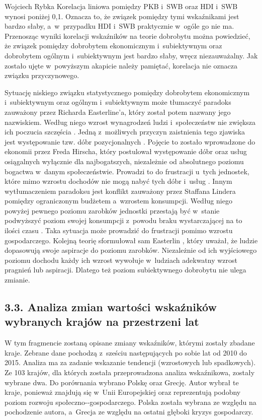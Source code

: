 \begin{artplenv}{Wojciech Rybka}
Korelacja liniowa pomiędzy PKB i~SWB oraz HDI i~SWB wynosi poniżej 0,1. Oznacza to, że związek pomiędzy tymi wskaźnikami
jest bardzo słaby, a~w~przypadku HDI i~SWB praktycznie w~ogóle go nie ma. Przenosząc wyniki korelacji wskaźników na
teorie dobrobytu można powiedzieć, że związek pomiędzy dobrobytem ekonomicznym i~subiektywnym oraz dobrobytem
ogólnym i~subiektywnym jest bardzo słaby, wręcz niezauważalny. Jak zostało ujęte w~powyższym akapicie należy pamiętać,
korelacja nie oznacza związku przyczynowego. 

Sytuację niskiego związku statystycznego pomiędzy dobrobytem ekonomicznym  i~subiektywnym oraz ogólnym i~subiektywnym
może tłumaczyć paradoks zauważony przez Richarda Easterline'a, który został potem nazwany jego nazwiskiem. Według niego
wzrost wynagrodzeń ludzi i~społeczeństw nie zwiększa ich poczucia szczęścia
\parencite{czapinski_ekonomia_2012}.
Jedną z~możliwych przyczyn zaistnienia tego zjawiska jest występowanie tzw. dóbr pozycjonalnych
\parencite{ostrowski_czy_2012}.
Pojęcie to zostało wprowadzone do ekonomii przez Freda Hirscha, który
postulował występowanie dóbr oraz usług osiągalnych wyłącznie dla najbogatszych, niezależnie od absolutnego poziomu
bogactwa w~danym społeczeństwie. Prowadzi to do frustracji u~tych jednostek, które mimo wzrostu dochodów nie mogą nabyć
tych dóbr i~usług
\parencite{hirsch_social_2005}.
Innym wytłumaczeniem paradoksu jest konflikt zauważony przez
Staffana Lindera pomiędzy ograniczonym budżetem a~wzrostem konsumpcji. Według niego powyżej pewnego poziomu zarobków
jednostki przestają być w~stanie podwyższyć poziom swojej konsumpcji z~powodu braku wystarczającej na to ilości czasu
\parencite{linder_harried_1970}.
Taka sytuacja może prowadzić do frustracji pomimo wzrostu gospodarczego.
Kolejną teorię sformułował sam Easterlin
\parencite*{easterlin_income_2001},
który uważał, że ludzie dopasowują swoje
aspiracje do poziomu zarobków. Niezależnie od ich wyjściowego poziomu dochodu każdy ich wzrost wywołuje w~ludziach
adekwatny wzrost pragnień lub aspiracji. Dlatego też poziom subiektywnego dobrobytu nie ulega zmianie.

\subsection{3.3. Analiza zmian wartości wskaźników wybranych krajów na przestrzeni lat}
W tym fragmencie zostaną opisane zmiany wskaźników, którymi zostały zbadane kraje. Zebrane dane pochodzą z~sześciu
następujących po sobie lat od 2010 do 2015. Analiza ma za zadanie wskazanie tendencji (wzrostowych lub spadkowych). Ze
103 krajów, dla których została przeprowadzona analiza wskaźnikowa, zostały wybrane dwa. Do porównania wybrano
Polskę oraz Grecję. Autor wybrał te kraje, ponieważ znajdują się w~Unii Europejskiej oraz
reprezentują podobny poziom rozwoju społeczno-\mbox{-gospodarczego}. Polska została wybrana ze względu na pochodzenie autora,
a~Grecja ze względu na ostatni głęboki kryzys gospodarczy. 


\end{artplenv}
